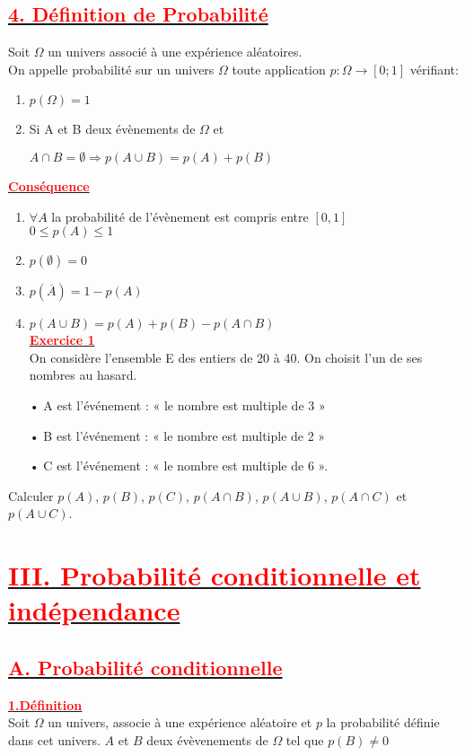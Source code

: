 \documentclass[12pt]{article}
\begin{document}
\subsection*{\underline{\textbf{\textcolor{red}{4. Définition de Probabilité}}}}
Soit $\Omega$ un univers associé à une expérience aléatoires.\\
On appelle probabilité sur un univers $\Omega$ toute application 
$p:\Omega \rightarrow[0;1]$ vérifiant:
\begin{enumerate}
\item $p(\Omega)=1$
\item Si A et B deux évènements de $\Omega$ et

$A\cap B=\emptyset \Longrightarrow p(A\cup B)=p(A)+p(B)$
\end{enumerate}
\underline{\textbf{\textcolor{red}{Conséquence}}}\\
\begin{enumerate}
\item $\forall A$ la probabilité de l'évènement est compris entre $[0,1]$\\
$0 \leq p(A)\leq 1$
\item $p(\emptyset)=0$
\item$p(\overline{A})=1-p(A)$
\item $p(A \cup B)=p(A)+p(B)-p(A\cap B)$\\
\underline{\textbf{\textcolor{red}{Exercice 1}}}\\
On considère l’ensemble E des entiers de 20 à 40. On choisit l’un de ses nombres au hasard.
\end{enumerate}
\begin{itemize}
\item[•] A est l’événement : « le nombre est multiple de 3 »
\item[•] B est l’événement : « le nombre est multiple de 2 »
\item[•] C est l’événement : « le nombre est multiple de 6 ».
\end{itemize}
Calculer $p(A)$, $p(B)$, $p(C)$, $p(A\cap B)$, $p(A\cup B)$, $p(A\cap C)$ et $p(A\cup C)$.

\section*{\underline{\textbf{\textcolor{red}{III. Probabilité conditionnelle et indépendance}}}}
\subsection*{\underline{\textbf{\textcolor{red}{A. Probabilité conditionnelle}}}}
\underline{\textbf{\textcolor{red}{1.Définition}}}\\
Soit $\Omega$ un univers, associe à une expérience aléatoire et $p$ la probabilité définie dans cet univers. $A$ et $B$ deux évèvenements de $\Omega$ tel que $p(B)\neq 0$
\end{document}
